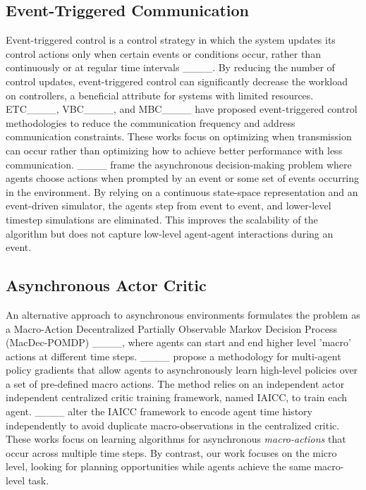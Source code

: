  \subsection{Event-Triggered Communication} 
 Event-triggered control is a control strategy in which the system updates its control actions only when certain events or conditions occur, rather than continuously or at regular time intervals ____. By reducing the number of control updates, event-triggered control can significantly decrease the workload on controllers, a beneficial attribute for systems with limited resources. ETC____, VBC____, and MBC____ have proposed event-triggered control methodologies to reduce the communication frequency and address communication constraints. These works focus on optimizing when transmission can occur rather than optimizing how to achieve better performance with less communication. ____ frame the asynchronous decision-making problem where agents choose actions when prompted by an event or some set of events occurring in the environment. By relying on a continuous state-space representation and an event-driven simulator, the agents step from event to event, and lower-level timestep simulations are eliminated. This improves the scalability of the algorithm but does not capture low-level agent-agent interactions during an event. 
\subsection{Asynchronous Actor Critic} 
An alternative approach to asynchronous environments formulates the problem as a Macro-Action Decentralized Partially Observable Markov Decision Process (MacDec-POMDP) ____, where agents can start and end higher level 'macro' actions at different time steps. ____ propose a methodology for multi-agent policy gradients that allow agents to asynchronously learn high-level policies over a set of pre-defined macro actions.  The method relies on an independent actor independent centralized critic training framework, named IAICC, to train each agent. ____  alter the IAICC framework to encode agent time history independently to avoid duplicate macro-observations in the centralized critic. These works focus on learning algorithms for asynchronous\textit{ macro-actions} that occur across multiple time steps. By contrast, our work focuses on the micro level, looking for planning opportunities while agents achieve the same macro-level task.


